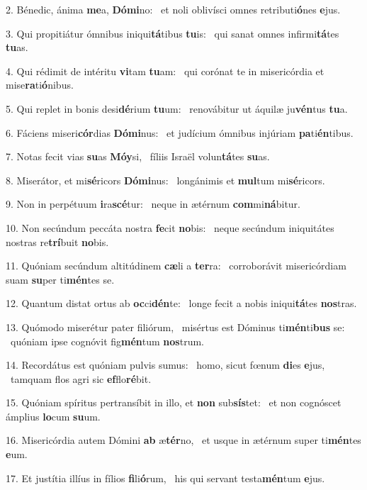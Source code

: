 2. Bénedic, ánima \textbf{me}a, \textbf{Dó}\textbf{mi}no: \ast\  et noli oblivísci omnes retributi\textbf{ó}nes \textbf{e}jus.\

3. Qui propitiátur ómnibus iniqui\textbf{tá}tibus \textbf{tu}is: \ast\  qui sanat omnes infirmi\textbf{tá}tes \textbf{tu}as.\

4. Qui rédimit de intéritu \textbf{vi}tam \textbf{tu}am: \ast\  qui corónat te in misericórdia et mise\textbf{ra}ti\textbf{ó}nibus.\

5. Qui replet in bonis desi\textbf{dé}rium \textbf{tu}um: \ast\  renovábitur ut áquilæ ju\textbf{vén}tus \textbf{tu}a.\

6. Fáciens miseri\textbf{cór}dias \textbf{Dó}\textbf{mi}nus: \ast\  et judícium ómnibus injúriam \textbf{pa}ti\textbf{én}tibus.\

7. Notas fecit vias \textbf{su}as \textbf{Mó}\textbf{y}si, \ast\  fíliis Israël volun\textbf{tá}tes \textbf{su}as.\

8. Miserátor, et mi\textbf{sé}ricors \textbf{Dó}\textbf{mi}nus: \ast\  longánimis et \textbf{mul}tum mi\textbf{sé}ricors.\

9. Non in perpétuum \textbf{i}ra\textbf{scé}tur: \ast\  neque in ætérnum \textbf{com}mi\textbf{ná}bitur.\

10. Non secúndum peccáta nostra \textbf{fe}cit \textbf{no}bis: \ast\  neque secúndum iniquitátes nostras re\textbf{trí}buit \textbf{no}bis.\

11. Quóniam secúndum altitúdinem \textbf{cæ}li a \textbf{ter}ra: \ast\  corroborávit misericórdiam suam \textbf{su}per ti\textbf{mén}tes se.\

12. Quantum distat ortus ab \textbf{oc}ci\textbf{dén}te: \ast\  longe fecit a nobis iniqui\textbf{tá}tes \textbf{nos}tras.\

13. Quómodo miserétur pater filiórum, \dag\  misértus est Dóminus ti\textbf{mén}ti\textbf{bus} se: \ast\  quóniam ipse cognóvit fig\textbf{mén}tum \textbf{nos}trum.\

14. Recordátus est quóniam pulvis sumus: \dag\  homo, sicut fœnum \textbf{di}es \textbf{e}jus, \ast\  tamquam flos agri sic \textbf{ef}flo\textbf{ré}bit.\

15. Quóniam spíritus pertransíbit in illo, et \textbf{non} sub\textbf{sís}tet: \ast\  et non cognóscet ámplius \textbf{lo}cum \textbf{su}um.\

16. Misericórdia autem Dómini \textbf{ab} æ\textbf{tér}no, \ast\  et usque in ætérnum super ti\textbf{mén}tes \textbf{e}um.\

17. Et justítia illíus in fílios \textbf{fi}li\textbf{ó}rum, \ast\  his qui servant testa\textbf{mén}tum \textbf{e}jus.\

